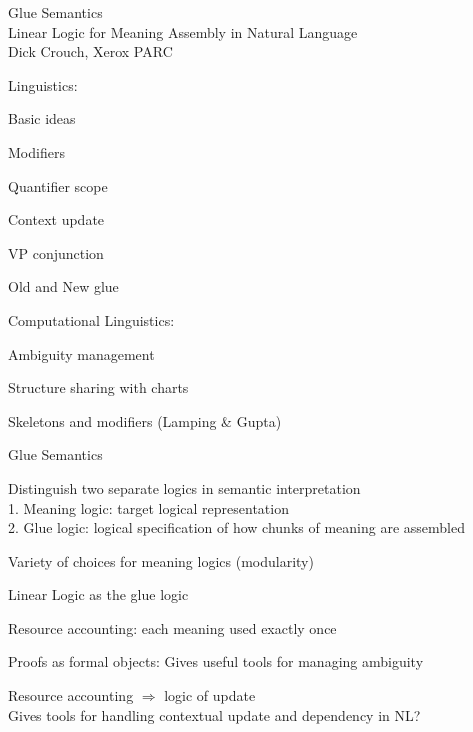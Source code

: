 \pagestyle{plain}

\begin{slide}{}
\begin{center}{\large
Glue Semantics\\
Linear Logic for Meaning Assembly in Natural Language}\\[2ex]
Dick Crouch, Xerox PARC
\end{center}

Linguistics:
{\small\begin{items}
\item Basic ideas
\item Modifiers
\item Quantifier scope
\item Context update
\item VP conjunction
\item Old and New glue
\end{items}}



Computational Linguistics:
{\small\begin{items}
\item Ambiguity management
\item Structure sharing with charts 
\item Skeletons and modifiers (Lamping \& Gupta)
\end{items}}
\end{slide}
\begin{hslide}{Glue Semantics}

Distinguish two separate logics in semantic interpretation\\
\hspace*{1em} 1. Meaning logic: {\small target logical representation}\\
\hspace*{1em} 2. Glue logic: {\small logical specification of how chunks of meaning are assembled}

\bigskip

Variety of choices for meaning logics (modularity)

\bigskip

Linear Logic as the glue logic
{\small\begin{items}
\item Resource accounting: each meaning used exactly once
\item Proofs as formal objects:
Gives useful tools for managing ambiguity
\item Resource accounting $\Rightarrow$ logic of update\\
 Gives tools for handling contextual update and dependency in
NL?
\end{items}}

\end{hslide}
 
